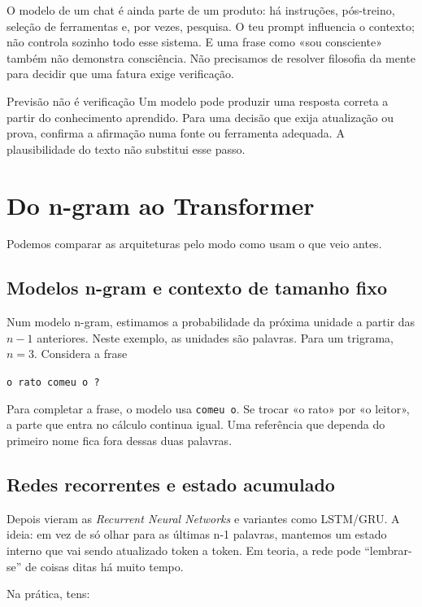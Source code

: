 O modelo de um chat é ainda parte de um produto: há instruções, pós-treino, seleção de ferramentas e, por vezes, pesquisa. O teu prompt influencia o contexto; não controla sozinho todo esse sistema. E uma frase como «sou consciente» também não demonstra consciência. Não precisamos de resolver filosofia da mente para decidir que uma fatura exige verificação.

\begin{keyideabox}{Previsão não é verificação}
Um modelo pode produzir uma resposta correta a partir do conhecimento aprendido. Para uma decisão que exija atualização ou prova, confirma a afirmação numa fonte ou ferramenta adequada. A plausibilidade do texto não substitui esse passo.
\end{keyideabox}


\section{Do n-gram ao Transformer}

Podemos comparar as arquiteturas pelo modo como usam o que veio antes.

\subsection*{Modelos n-gram e contexto de tamanho fixo}

Num modelo n-gram, estimamos a probabilidade da próxima unidade a partir das $n-1$ anteriores. Neste exemplo, as unidades são palavras. Para um trigrama, $n=3$. Considera a frase
\begin{center}
\texttt{o rato comeu o ?}
\end{center}
Para completar a frase, o modelo usa \texttt{comeu o}. Se trocar «o rato» por «o leitor», a parte que entra no cálculo continua igual. Uma referência que dependa do primeiro nome fica fora dessas duas palavras.

\subsection*{Redes recorrentes e estado acumulado}

Depois vieram as \emph{Recurrent Neural Networks} e variantes como LSTM/GRU. A ideia: em vez de só olhar para as últimas n-1 palavras, mantemos um estado interno que vai sendo atualizado token a token. Em teoria, a rede pode “lembrar-se” de coisas ditas há muito tempo.

Na prática, tens:

